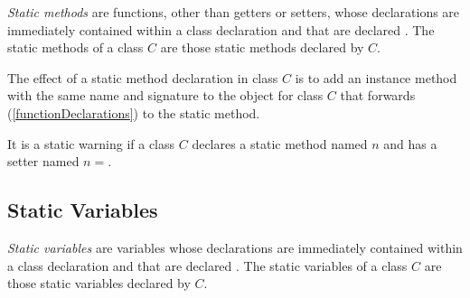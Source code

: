 \documentclass{article}
\begin{document}
\LMHash{}
{\em Static methods} are functions, other than getters or setters, whose declarations are immediately contained within a class declaration and that are declared \STATIC{}.
The static methods of a class $C$ are those static methods declared by $C$.

\LMHash{}
The effect of a static method declaration in class $C$ is to add an instance method with the same name and signature to the  object for class $C$ that forwards (\ref{functionDeclarations}) to the static method.


\LMHash{}
It is a static warning if a class $C$ declares a static method named $n$ and has a setter named $n=$.


\subsection{Static Variables}

\LMHash{}
{\em Static variables} are variables whose declarations are immediately contained within a class declaration and that are declared \STATIC{}.
The static variables of a class $C$ are those static variables declared by $C$.




\end{document}
